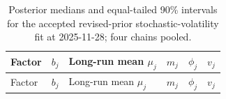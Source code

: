 \documentclass[
  12pt,
  letterpaper,
  DIV=11,
  numbers=noendperiod]{scrreprt}
\begin{document}
\begin{longtable}[]{@{}
  >{\raggedright\arraybackslash}p{}
  >{\raggedleft\arraybackslash}p{}
  >{\raggedleft\arraybackslash}p{}
  >{\raggedleft\arraybackslash}p{}
  >{\raggedleft\arraybackslash}p{}
  >{\raggedleft\arraybackslash}p{}@{}}
\caption{Posterior medians and equal-tailed 90\% intervals for the
accepted revised-prior stochastic-volatility fit at 2025-11-28; four
chains pooled.}\label{tbl-posterior-parameters}\tabularnewline
\toprule\noalign{}
\begin{minipage}[b]{\linewidth}\raggedright
Factor
\end{minipage} & \begin{minipage}[b]{\linewidth}\raggedleft
\(b_j\)
\end{minipage} & \begin{minipage}[b]{\linewidth}\raggedleft
Long-run mean \(\mu_j\)
\end{minipage} & \begin{minipage}[b]{\linewidth}\raggedleft
\(m_j\)
\end{minipage} & \begin{minipage}[b]{\linewidth}\raggedleft
\(\phi_j\)
\end{minipage} & \begin{minipage}[b]{\linewidth}\raggedleft
\(v_j\)
\end{minipage} \\
\midrule\noalign{}
\endfirsthead
\toprule\noalign{}
\begin{minipage}[b]{\linewidth}\raggedright
Factor
\end{minipage} & \begin{minipage}[b]{\linewidth}\raggedleft
\(b_j\)
\end{minipage} & \begin{minipage}[b]{\linewidth}\raggedleft
Long-run mean \(\mu_j\)
\end{minipage} & \begin{minipage}[b]{\linewidth}\raggedleft
\(m_j\)
\end{minipage} & \begin{minipage}[b]{\linewidth}\raggedleft
\(\phi_j\)
\end{minipage} & \begin{minipage}[b]{\linewidth}\raggedleft
\(v_j\)

\end{minipage}
\end{longtable}
\end{document}
